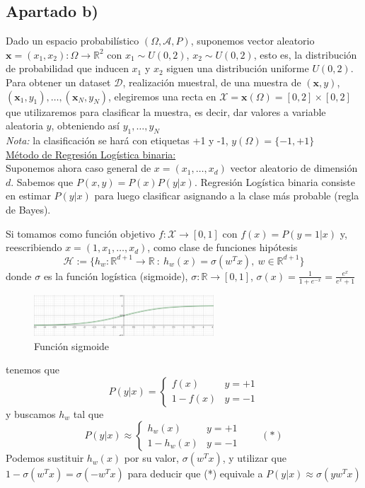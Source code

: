 \documentclass[11pt,a4paper]{article}
\theoremstyle{definition}
\newcommand{\R}{\mathbb{R}}
\begin{document}
    \subsection{Apartado b)}
    Dado un espacio probabilístico $(\Omega,\mathcal{A},P)$, suponemos vector aleatorio $\mathbf{x}=(x_1, x_2)\colon \Omega \to \R ^2$ con $x_1 \sim U(0,2)$, $x_2 \sim U(0,2)$, esto es, la distribución de probabilidad que inducen $x_1$ y $x_2$ siguen una distribución uniforme $U(0,2)$. Para obtener un dataset $\mathcal{D}$, realización muestral, de una muestra de $(\mathbf{x},y)$, $(\mathbf{x}_1,y_1),\ldots,(\mathbf{x}_N,y_N)$, elegiremos una recta en $\mathcal{X}=\mathbf{x}(\Omega)=[0,2]\times[0,2]$ que utilizaremos para clasificar la muestra, es decir, dar valores a variable aleatoria $y$, obteniendo así $y_1,\ldots,y_N$ \\
    \textit{Nota:} la clasificación se hará con etiquetas +1 y -1, $y(\Omega)=\{-1,+1\}$\\
    
    \underline{Método de Regresión Logística binaria:} \\%
    Suponemos ahora caso general de $x=(x_1,\ldots,x_d)$ vector aleatorio de dimensión $d$. Sabemos que $P(x,y)=P(x)P(y|x)$. Regresión Logística binaria consiste en estimar $P(y|x)$ para luego clasificar asignando a la clase más probable (regla de Bayes).
    
    Si tomamos como función objetivo $f\colon \mathcal{X}\to [0,1]$ con $f(x)=P(y=1|x)$ y, reescribiendo $x=(1,x_1,\ldots,x_d)$,  como clase de funciones hipótesis
    $$\mathcal{H}:=\{h_w\colon \R^{d+1}\to \R \ :\ h_w(x)=\sigma(w^Tx),\ w \in \R^{d+1}\}$$
	donde $\sigma$ es la función logística (sigmoide), $\sigma\colon \R \to [0,1]$, $\sigma(x)=\frac{1}{1+e^{-x}}=\frac{e^x}{e^x+1}$
	\begin{figure}[H]
	\centering
	\includegraphics[width=0.6\textwidth]{images/sigmoide}
	\caption{Función sigmoide}
	\end{figure}
	tenemos que 
	$$ P(y| x) = \begin{cases} f(x) & y=+1 \\
	1-f(x) & y=-1
	\end{cases}$$
	y buscamos $h_w$ tal que 
	$$P(y| x)\approx \begin{cases} h_w(x) & y=+1\\
	1 - h_w(x) & y=-1
	\end{cases} \quad \quad (*)$$
	Podemos sustituir $h_w(x)$ por su valor, $\sigma(w^Tx)$, y utilizar que $1-\sigma(w^Tx)=\sigma(-w^Tx)$ para deducir que (*) equivale a  $P(y|x)\approx \sigma(yw^Tx)$\\
	
\end{document}
